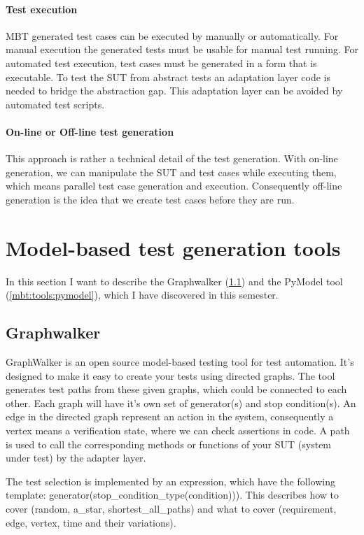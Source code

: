 \paragraph{Test execution}
MBT generated test cases can be executed by manually or automatically. For manual execution the generated tests must be usable for manual test running. For automated test execution, test cases must be generated in a form that is executable. To test the SUT from abstract tests an adaptation layer code is needed to bridge the abstraction gap. This adaptation layer can be avoided by automated test scripts.

\paragraph{On-line or Off-line test generation}
This approach is rather a technical detail of the test generation. With on-line generation, we can manipulate the SUT and test cases while executing them, which means parallel test case generation and execution. Consequently off-line generation is the idea that we create test cases before they are run.

\section{Model-based test generation tools}
In this section I want to describe the Graphwalker (\ref{mbt:tools:graphwalker}) and the PyModel tool (\ref{mbt:tools:pymodel}), which I have discovered in this semester.

\subsection{Graphwalker} \label{mbt:tools:graphwalker}

GraphWalker is an open source model-based testing tool for test automation. It's designed to make it easy to create your tests using directed graphs. The tool generates test paths from these given graphs, which could be connected to each other. Each graph will have it's own set of generator(s) and stop condition(s).  An edge in the directed graph represent an action in the system, consequently a vertex means a verification state, where we can check assertions in code. A path is used to call the corresponding methods or functions of your SUT (system under test) by the adapter layer. 

The test selection is implemented by an expression, which have the following template: generator(stop\_condition\_type(condition))). This describes how to cover (random, a\_star, shortest\_all\_paths) and what to cover (requirement, edge, vertex, time and their variations).



